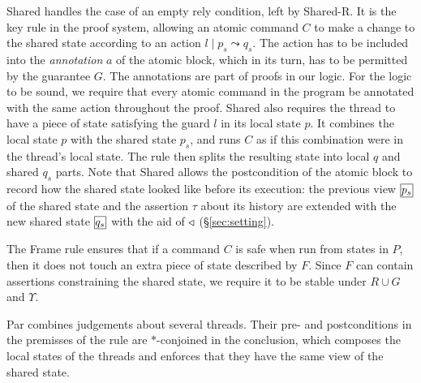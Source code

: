 {\sc Shared} handles the case of an empty rely condition, left by {\sc
  Shared-R}.  It is the key rule in the proof system, allowing an atomic command
$C$ to make a change to the shared state according to an action $l \mid p_s
\leadsto q_s$. The action has to be included into the {\em annotation} $a$ of
the atomic block, which in its turn, has to be permitted by the guarantee $G$.
The annotations are part of proofs in our logic.  For the logic to be sound, we
require that every atomic command in the program be annotated with the same
action throughout the proof.  {\sc Shared} also requires the thread to have a
piece of state satisfying the guard $l$ in its local state $p$. It combines the
local state $p$ with the shared state $p_s$, and runs $C$ as if this
combination were in the thread's local state. The rule then splits the resulting
state into local $q$ and shared $q_s$ parts. Note that {\sc Shared} allows the
postcondition of the atomic block to record how the shared state looked like
before its execution: the previous view $\shareds{p_s}$ of the shared state and
the assertion $\tau$ about its history are extended with the new shared state
$\shareds{q_s}$ with the aid of $\triangleleft$ (\S\ref{sec:setting}).



The {\sc Frame} rule ensures that if a command $C$ is safe when run from states
in $P$, then it does not touch an extra piece of state described by $F$. Since
$F$ can contain assertions constraining the shared state, we require it to be
stable under $R \cup G$ and $\Upsilon$. 



{\sc Par} combines judgements about several threads.  Their pre- and
postconditions in the premisses of the rule are $*$-conjoined in the conclusion,
which composes the local states of the threads and enforces that they have the
same view of the shared state.




